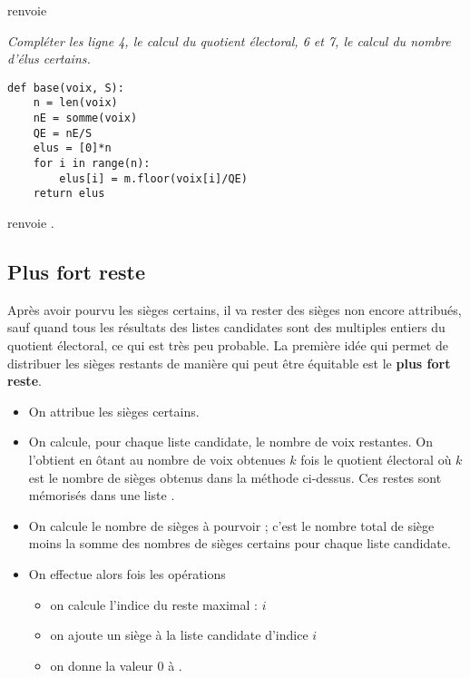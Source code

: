 \smallskip
{} renvoie 
\begin{Exercise}[title = {Lignes 4, 6 et 7}]\it
Compléter les ligne 4, le calcul du quotient électoral, 6 et 7, le calcul du nombre d'élus certains.
\end{Exercise}
\begin{Answer}
\begin{lstlisting}
def base(voix, S):
    n = len(voix)
    nE = somme(voix)
    QE = nE/S
    elus = [0]*n
    for i in range(n):
        elus[i] = m.floor(voix[i]/QE)
    return elus
\end{lstlisting}
\end{Answer}
\smallskip
{} renvoie \type{[4, 3, 1]}.
\subsection{Plus fort reste}
Après avoir pourvu les sièges certains, il va rester des sièges non encore attribués, sauf quand tous les résultats des listes candidates sont des multiples entiers du quotient électoral, ce qui est très peu probable. La première idée qui permet de distribuer les sièges restants de manière qui peut être équitable est le {\bf plus fort reste}.

\begin{itemize}
\item On attribue les sièges certains.
\item On calcule, pour chaque liste candidate, le nombre de voix restantes. On l'obtient en ôtant au  nombre de voix obtenues $k$ fois le quotient électoral où $k$ est le nombre de sièges obtenus dans la méthode ci-dessus. Ces restes sont mémorisés dans une liste .
\item On calcule le nombre de sièges à pourvoir  ; c'est le nombre total de siège moins la somme des nombres de sièges certains pour chaque liste candidate.
\item On effectue alors  fois les opérations 
\begin{itemize}
\item on calcule l'indice du reste maximal : $i$
\item on ajoute un siège à la liste candidate d'indice $i$
\item on donne la valeur 0 à .
\end{itemize}
\end{itemize}

